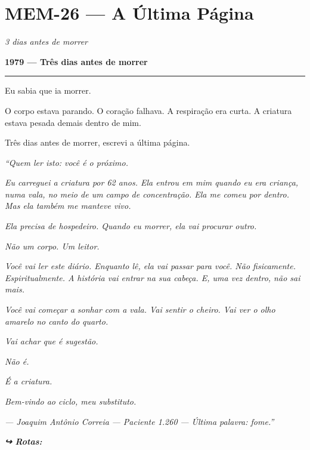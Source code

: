 \section*{\textbf{MEM-26} --- A Última Página}

\noindent \textit{3 dias antes de morrer}

\noindent \textbf{1979 --- Três dias antes de morrer}

\vspace{0.5em}\noindent\rule{\textwidth}{0.5pt}\vspace{0.5em}

\noindent Eu sabia que ia morrer.

\noindent O corpo estava parando. O coração falhava. A respiração era curta. A criatura estava pesada demais dentro de mim.

\noindent Três dias antes de morrer, escrevi a última página.

\noindent \textit{\textquotedblleft{}Quem ler isto: você é o próximo.}

\noindent \textit{Eu carreguei a criatura por 62 anos. Ela entrou em mim quando eu era criança, numa vala, no meio de um campo de concentração. Ela me comeu por dentro. Mas ela também me manteve vivo.}

\noindent \textit{Ela precisa de hospedeiro. Quando eu morrer, ela vai procurar outro.}

\noindent \textit{Não um corpo. Um leitor.}

\noindent \textit{Você vai ler este diário. Enquanto lê, ela vai passar para você. Não fisicamente. Espiritualmente. A história vai entrar na sua cabeça. E, uma vez dentro, não sai mais.}

\noindent \textit{Você vai começar a sonhar com a vala. Vai sentir o cheiro. Vai ver o olho amarelo no canto do quarto.}

\noindent \textit{Vai achar que é sugestão.}

\noindent \textit{Não é.}

\noindent \textit{É a criatura.}

\noindent \textit{Bem-vindo ao ciclo, meu substituto.}

\noindent \textit{--- Joaquim Antônio Correia}
\textit{--- Paciente 1.260}
\textit{--- Última palavra: fome.\textquotedblright{}}

\vspace{0.5em}
\noindent\textit{\textbf{↪ Rotas:}  \rotasep {}}

